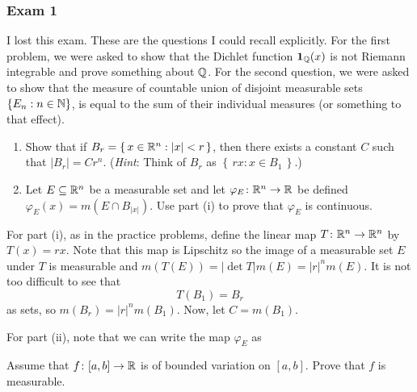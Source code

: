 \subsubsection{Exam 1}
\setcounter{exercise}{0}
\setcounter{equation}{0}

I lost this exam. These are the questions I could recall explicitly. For
the first problem, we were asked to show that the Dichlet function
\(\operatorname{\mathbf{1}}_{\mathbb{Q}}(x)\) is not Riemann integrable and prove something about
\(\mathbb{Q}\). For the second question, we were asked to show that the measure
of countable union of disjoint measurable sets \(\{E_n:n\in\mathbb{N}\}\), is
equal to the sum of their individual measures (or something to that
effect).
\begin{problem}
\end{problem}

\begin{problem}
\end{problem}

\begin{problem}
\hfill
\begin{enumerate}[label=(\roman*)]
\item Show that if \(B_r=\left\{\,x\in\mathbb{R}^n:|x|<r\,\right\}\), then there
  exists a constant \(C\) such that \(|B_r|=Cr^n\). (\emph{Hint}: Think of
  \(B_r\) as \(\left\{\,rx:x\in B_1\,\right\}\).)
\item Let \(E\subseteq\mathbb{R}^n\) be a measurable set and let
  \(\varphi_E\colon\mathbb{R}^n\to\mathbb{R}\) be defined
  \(\varphi_E(x)=m(E\cap B_{|x|})\). Use part (i) to prove that
  \(\varphi_E\) is continuous.
\end{enumerate}
\end{problem}
\begin{solution}
  For part (i), as in the practice problems, define the linear map
  \(T\colon\mathbb{R}^n\to\mathbb{R}^n\) by \(T(x)=rx\). Note that this map is
  Lipschitz so the image of a measurable set \(E\) under \(T\) is
  measurable and \(m(T(E))=|{\det T}|m(E)=|r|^nm(E)\). It is not too
  difficult to see that
  \[
    T(B_1)=B_r
  \]
  as sets, so \(m(B_r)=|r|^nm(B_1)\). Now, let \(C=m(B_1)\).

  For part (ii), note that we can write the map \(\varphi_E\) as
\end{solution}

\begin{problem}
  Assume that \(f\colon[a,b]\to\mathbb{R}\) is of bounded variation on
  \([a,b]\). Prove that \(f\) is measurable.
\end{problem}
\begin{solution}
\end{solution}

